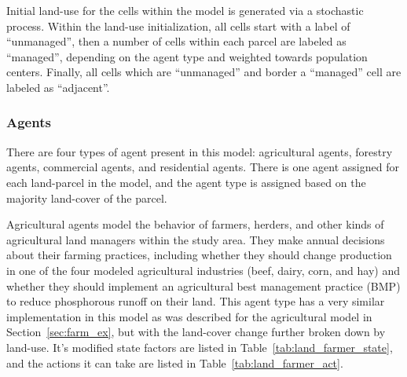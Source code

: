 Initial land-use for the cells within the model is generated via
a stochastic process.
Within the land-use initialization, all cells start with
a label of ``unmanaged'',
then a number of cells within each parcel are labeled as ``managed'',
depending on the agent type and weighted towards population centers.
Finally, all cells which are ``unmanaged'' and border a ``managed''
cell are labeled as ``adjacent''.

\subsubsection{Agents}
\label{subsubsec:land_exp_agents}

There are four types of agent present in this model:
agricultural agents, forestry agents, commercial agents,
and residential agents.
There is one agent assigned for each land-parcel in the model,
and the agent type is assigned based on the majority land-cover
of the parcel.

Agricultural agents model the behavior of farmers, herders, 
and other kinds of agricultural land managers within the study area.
They make annual decisions about their farming practices,
including whether they should change production in one of the four modeled 
agricultural industries (beef, dairy, corn, and hay) 
and whether they should implement an agricultural best management practice 
(BMP) to reduce phosphorous runoff on their land.
This agent type has a very similar implementation in this model
as was described for the agricultural model in Section~\ref{sec:farm_ex},
but with the land-cover change further broken down by land-use.
It's modified state factors are listed in Table~\ref{tab:land_farmer_state},
and the actions it can take are listed in Table~\ref{tab:land_farmer_act}.

